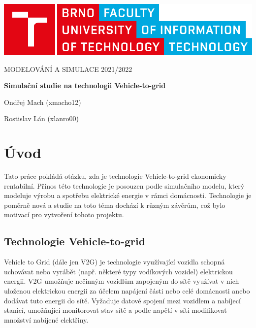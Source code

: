 \documentclass[12pt,a4paper]{article}
\begin{document}
\begin{titlepage}
\begin{center}
\includegraphics[width=0.5\linewidth]{img/logo.pdf}
\vspace{3cm}

\LARGE\uppercase{Modelování a simulace 2021/2022}
\vspace{1cm}

\LARGE\textbf{Simulační studie na technologii Vehicle-to-grid}

\vspace*{\fill}
\large{Ondřej Mach (xmacho12)}

\large{Rostislav Lán (xlanro00)}

\end{center}
\end{titlepage}


\setcounter{page}{1}
\tableofcontents
\clearpage


\section{Úvod}
Tato práce pokládá otázku, zda je technologie Vehicle-to-grid ekonomicky rentabilní.
Přínos této technologie je posouzen podle simulačního modelu, který modeluje výrobu a spotřebu elektrické energie v rámci domácnosti.
Technologie je poměrně nová a studie na toto téma dochází k různým závěrům, což bylo motivací pro vytvoření tohoto projektu.

\subsection{Technologie Vehicle-to-grid}
Vehicle to Grid (dále jen V2G) je technologie využívající vozidla schopná uchovávat nebo vyrábět (např. některé typy vodíkových vozidel) elektrickou energii. V2G umožňuje nečinným vozidlům zapojeným do sítě využívat v nich uloženou elektrickou energii za účelem napájení části nebo celé domácnosti anebo dodávat tuto energii do sítě.
Vyžaduje datové spojení mezi vozidlem a nabíjecí stanicí, umožňující monitorovat stav sítě a podle napětí v síti modifikovat množství nabíjené elektřiny.
\end{document}
